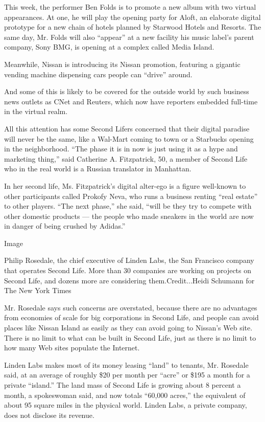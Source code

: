 This week, the performer Ben Folds is to promote a new album with two
virtual appearances. At one, he will play the opening party for Aloft,
an elaborate digital prototype for a new chain of hotels planned by
Starwood Hotels and Resorts. The same day, Mr. Folds will also
``appear'' at a new facility his music label's parent company, Sony BMG,
is opening at a complex called Media Island.

Meanwhile, Nissan is introducing its Nissan promotion, featuring a
gigantic vending machine dispensing cars people can ``drive'' around.

And some of this is likely to be covered for the outside world by such
business news outlets as CNet and Reuters, which now have reporters
embedded full-time in the virtual realm.

All this attention has some Second Lifers concerned that their digital
paradise will never be the same, like a Wal-Mart coming to town or a
Starbucks opening in the neighborhood. ``The phase it is in now is just
using it as a hype and marketing thing,'' said Catherine A. Fitzpatrick,
50, a member of Second Life who in the real world is a Russian
translator in Manhattan.

In her second life, Ms. Fitzpatrick's digital alter-ego is a figure
well-known to other participants called Prokofy Neva, who runs a
business renting ``real estate'' to other players. ``The next phase,''
she said, ``will be they try to compete with other domestic products ---
the people who made sneakers in the world are now in danger of being
crushed by Adidas.''

Image

Philip Rosedale, the chief executive of Linden Labs, the San Francisco
company that operates Second Life. More than 30 companies are working on
projects on Second Life, and dozens more are considering
them.Credit...Heidi Schumann for The New York Times

Mr. Rosedale says such concerns are overstated, because there are no
advantages from economies of scale for big corporations in Second Life,
and people can avoid places like Nissan Island as easily as they can
avoid going to Nissan's Web site. There is no limit to what can be built
in Second Life, just as there is no limit to how many Web sites populate
the Internet.

Linden Labs makes most of its money leasing ``land'' to tenants, Mr.
Rosedale said, at an average of roughly \$20 per month per ``acre'' or
\$195 a month for a private ``island.'' The land mass of Second Life is
growing about 8 percent a month, a spokeswoman said, and now totals
``60,000 acres,'' the equivalent of about 95 square miles in the
physical world. Linden Labs, a private company, does not disclose its
revenue.

